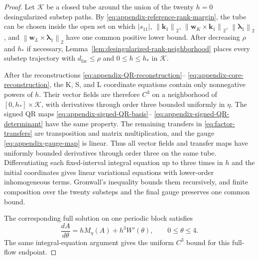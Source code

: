 \documentclass[]{article}
\numberwithin{equation}{section}
\theoremstyle{plain}
\theoremstyle{remark}
\newcommand{\norm}[1]{\left\lVert #1\right\rVert}
\begin{document}
\begin{proof}
Let $\mathcal K$ be a closed tube around the union of the twenty
$h=0$ desingularized substep paths.  By
\eqref{eq:appendix-reference-rank-margin}, the tube can be chosen inside
the open set on which $|s_{11}|$, $\norm{\boldsymbol k_1}_2$,
$\norm{\boldsymbol w_K\times\boldsymbol k_1}_2$,
$\norm{\boldsymbol\lambda_1}_2$, and
$\norm{\boldsymbol w_L\times\boldsymbol\lambda_1}_2$ have one common
positive lower bound.  After decreasing $\rho$ and $h_*$ if necessary,
Lemma~\ref{lem:desingularized-rank-neighborhood} places every substep
trajectory with $d_{\mathrm{fac}}\le\rho$ and $0\le h\le h_*$ in $\mathcal K$.

After the reconstructions \eqref{eq:appendix-QR-reconstruction}--
\eqref{eq:appendix-core-reconstruction}, the K, S, and L coordinate
equations contain only nonnegative powers of $h$.  Their vector fields
are therefore $C^3$ on a neighborhood of
$[0,h_*]\times\mathcal K$, with derivatives through order three bounded
uniformly in $\eta$.  The signed QR maps
\eqref{eq:appendix-signed-QR-basis}--
\eqref{eq:appendix-signed-QR-determinant} have the same property.  The
remaining transfers in \eqref{eq:factor-transfers} are transposition
and matrix multiplication, and the gauge
\eqref{eq:appendix-gauge-map} is linear.  Thus all vector fields and
transfer maps have uniformly bounded derivatives through order three
on the same tube.  Differentiating each fixed-interval integral
equation up to three times in $h$ and the initial coordinates gives
linear variational equations with lower-order inhomogeneous terms.
Gronwall's inequality bounds them recursively, and finite composition
over the twenty substeps and the final gauge preserves one common bound.

The corresponding full solution on one periodic block satisfies
\begin{equation}\label{eq:appendix-full-flow-parameter-equation}
 \frac{dA}{d\theta}=hM_\eta(A)+h^3W'(\theta),
 \qquad 0\le\theta\le4.
\end{equation}
The same integral-equation argument gives the uniform \(C^3\) bound for
this full-flow endpoint.


\end{proof}
\end{document}
